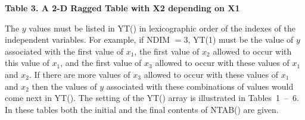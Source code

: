 \documentclass[twoside]{MATH77}
\begin{document}
\begin{center}
{\bf Table 3. A 2-D Ragged Table with X2 depending on X1}\vspace{5pt}
\end{center}

The $y$ values must be listed in YT() in lexicographic order of the
indexes of the independent variables. For example, if NDIM $= 3$,
YT(1) must be the value of $y$ associated with the first value of
$x_1$, the first value of $x_2$ allowed to occur with this value of
$x_1$, and the first value of $x_3$ allowed to occur with these
values of $x_1$ and $x_2$. If there are more values of $x_3$ allowed
to occur with these values of $x_1$ and $x_2$ then the values of $y$
associated with these combinations of values would come next in YT().
The setting of the YT() array is illustrated in Tables~1~--~6.  In
these tables both the initial and the final contents of NTAB() are
given.
\end{document}
